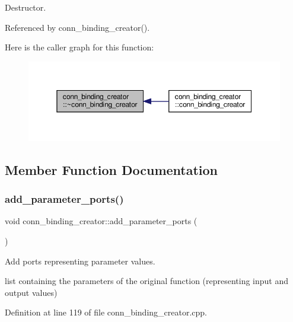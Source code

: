 Destructor. 



Referenced by conn\+\_\+binding\+\_\+creator().

Here is the caller graph for this function\+:
\nopagebreak
\begin{figure}[H]
\begin{center}
\leavevmode
\includegraphics[width=350pt]{dc/d1b/classconn__binding__creator_afb5c0a1ec11cfa1523842efbbe44aa4e_icgraph}
\end{center}
\end{figure}


\subsection{Member Function Documentation}
\mbox{\label{classconn__binding__creator_a82010cffa9f6621f20ad7be071dc83c7}} 
\subsubsection{\texorpdfstring{add\+\_\+parameter\+\_\+ports()}{add\_parameter\_ports()}}
{\footnotesize\ttfamily void conn\+\_\+binding\+\_\+creator\+::add\+\_\+parameter\+\_\+ports (\begin{DoxyParamCaption}{ }\end{DoxyParamCaption})\hspace{0.3cm}{\ttfamily [protected]}}



Add ports representing parameter values. 

list containing the parameters of the original function (representing input and output values) 

Definition at line 119 of file conn\+\_\+binding\+\_\+creator.\+cpp.



